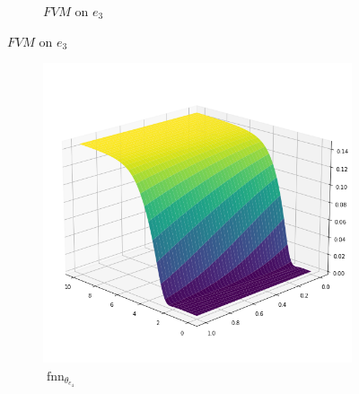 \begin{figure}[H]
\begin{center}
\begin{subfigure}[b]{0.4\textwidth}
\begin{center}
            \end{center}
            \caption{$FVM$ on $e_3$}
        \end{subfigure}
    \end{center}
\end{figure}
\begin{figure}[H]
    \begin{center}
        \begin{subfigure}[b]{0.4\textwidth}
            \begin{center}
                \includegraphics[scale=0.35]{img/Kante4.png}
            \end{center}
            \caption{$\operatorname{fnn}_{\theta_{e_4}}$}
        \end{subfigure} \hspace{15mm}
        \begin{subfigure}[b]{0.4\textwidth}
            \begin{center}

\end{center}
\end{subfigure}
\end{center}
\end{figure}
